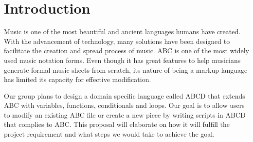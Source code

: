 \section{Introduction}

Music is one of the most beautiful and ancient languages humans have created. With the advancement of technology, many solutions have been designed to facilitate the creation and spread process of music. ABC is one of the most widely used music notation forms. Even though it has great features to help musicians generate formal music sheets from scratch, its nature of being a markup language has limited its capacity for effective modification.

Our group plans to design a domain specific language called ABCD that extends ABC with variables, functions, conditionals and loops. Our goal is to allow users to modify an existing ABC file or create a new piece by writing scripts in ABCD that complies to ABC. This proposal will elaborate on how it will fulfill the project requirement and what steps we would take to achieve the goal.

